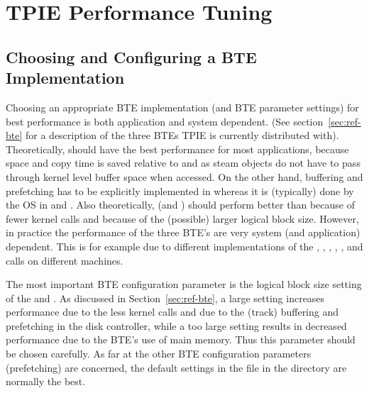 \section{TPIE Performance Tuning}

\subsection{Choosing and Configuring a BTE Implementation}
\label{sec:choosingbte}


Choosing an appropriate BTE implementation (and BTE parameter settings) for
best performance is both application and system dependent. (See
section~\ref{sec:ref-bte} for a description of the three BTEs TPIE is
currently distributed with). Theoretically,  should have the
best performance for most applications, because space and copy time is
saved relative to  and  as steam objects do
not have to pass through kernel level buffer space when accessed. On the
other hand, buffering and prefetching has to be explicitly implemented in
 whereas it is (typically) done by the OS in 
and . Also theoretically,  (and )
should perform better than  because of fewer kernel calls
and because of the (possible) larger logical block size. However, in
practice the performance of the three BTE's are very system (and
application) dependent. This is for example due to different
implementations of the , , ,
, , and  calls on different
machines.

The most important BTE configuration parameter is the logical block size
setting of the  and . As discussed in
Section~\ref{sec:ref-bte}, a large setting increases performance due to the
less kernel calls and due to the (track) buffering and prefetching in the
disk controller, while a too large setting results in decreased performance
due to the BTE's use of main memory. Thus this parameter should be chosen
carefully. As far at the other BTE configuration parameters (prefetching)
are concerned, the default settings in the  file in the
 directory are normally the best.


